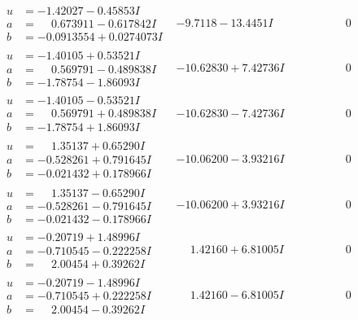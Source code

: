 \documentclass[1p]{elsarticle_modified}
\theoremstyle{definition}
\begin{document}
$$\begin{array}{c|c|c}
\begin{aligned}
u &= -1.42027 - 0.45853 I \\
a &= \phantom{-}0.673911 - 0.617842 I \\
b &= -0.0913554 + 0.0274073 I\end{aligned}
 & -9.7118 - 13.4451 I & \phantom{-0.000000 } 0 \\ \hline\begin{aligned}
u &= -1.40105 + 0.53521 I \\
a &= \phantom{-}0.569791 - 0.489838 I \\
b &= -1.78754 - 1.86093 I\end{aligned}
 & -10.62830 + 7.42736 I & \phantom{-0.000000 } 0 \\ \hline\begin{aligned}
u &= -1.40105 - 0.53521 I \\
a &= \phantom{-}0.569791 + 0.489838 I \\
b &= -1.78754 + 1.86093 I\end{aligned}
 & -10.62830 - 7.42736 I & \phantom{-0.000000 } 0 \\ \hline\begin{aligned}
u &= \phantom{-}1.35137 + 0.65290 I \\
a &= -0.528261 + 0.791645 I \\
b &= -0.021432 + 0.178966 I\end{aligned}
 & -10.06200 - 3.93216 I & \phantom{-0.000000 } 0 \\ \hline\begin{aligned}
u &= \phantom{-}1.35137 - 0.65290 I \\
a &= -0.528261 - 0.791645 I \\
b &= -0.021432 - 0.178966 I\end{aligned}
 & -10.06200 + 3.93216 I & \phantom{-0.000000 } 0 \\ \hline\begin{aligned}
u &= -0.20719 + 1.48996 I \\
a &= -0.710545 - 0.222258 I \\
b &= \phantom{-}2.00454 + 0.39262 I\end{aligned}
 & \phantom{-}1.42160 + 6.81005 I & \phantom{-0.000000 } 0 \\ \hline\begin{aligned}
u &= -0.20719 - 1.48996 I \\
a &= -0.710545 + 0.222258 I \\
b &= \phantom{-}2.00454 - 0.39262 I\end{aligned}
 & \phantom{-}1.42160 - 6.81005 I & \phantom{-0.000000 } 0 \\ \hline\begin{aligned}

\end{aligned}
\end{array}$$
\end{document}
